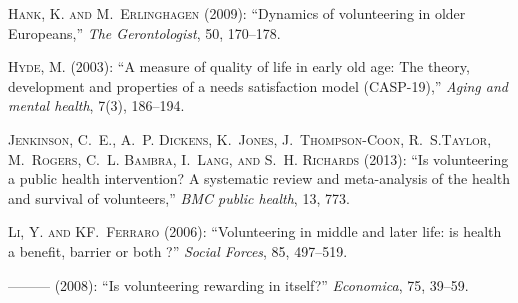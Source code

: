 \documentclass[10pt, letterpaper]{article}
\begin{document}
\begin{spacing}{1.4}
\begin{thebibliography}{87}
  
\textsc{Hank, K. and M.~Erlinghagen} (2009): \enquote{Dynamics of volunteering in older Europeans,} \emph{The Gerontologist}, 50, 170--178.  

\textsc{Hyde, M.} (2003): \enquote{A measure of quality of life in early old age: The theory, development and properties of a needs satisfaction model (CASP-19),} \emph{Aging and mental health}, 7(3), 186--194. 


\textsc{Jenkinson, C.~E., A.~P. Dickens, K.~Jones, J.~Thompson-Coon, R.~S.Taylor, M.~Rogers, C.~L. Bambra, I.~Lang, and S.~H. Richards} (2013):
  \enquote{Is volunteering a public health intervention? A systematic review and meta-analysis of the health and survival of volunteers,} \emph{BMC public health}, 13, 773.

\textsc{Li, Y. and KF.~Ferraro} (2006): \enquote{Volunteering in middle and later life: is health a benefit, barrier or both ?} \emph{Social Forces}, 85, 497--519. 


---\hspace{-.1pt}---\hspace{-.1pt}--- (2008{}): \enquote{Is volunteering rewarding in itself?} \emph{Economica}, 75, 39--59.


\end{thebibliography}
\end{spacing}
\end{document}
